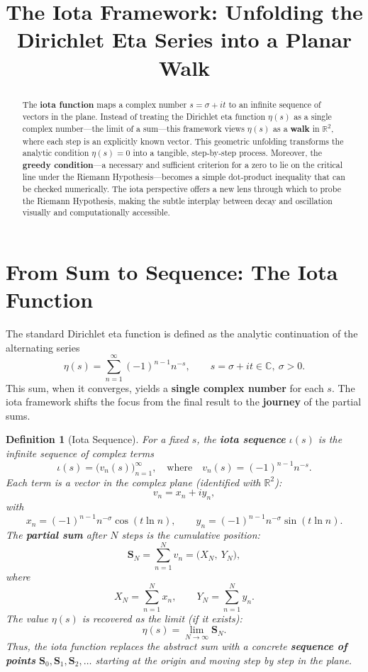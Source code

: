 \documentclass[12pt,a4paper]{article}
\title{The Iota Framework: Unfolding the Dirichlet Eta Series into a Planar Walk}
\author{}
\date{}
\newtheorem{definition}{Definition}[section]
\begin{document}
\maketitle

\begin{abstract}
The \textbf{iota function} maps a complex number \( s = \sigma + it \) to an infinite sequence of vectors in the plane. Instead of treating the Dirichlet eta function \(\eta(s)\) as a single complex number---the limit of a sum---this framework views \(\eta(s)\) as a \textbf{walk} in \(\mathbb{R}^2\), where each step is an explicitly known vector. This geometric unfolding transforms the analytic condition \(\eta(s) = 0\) into a tangible, step‑by‑step process. Moreover, the \textbf{greedy condition}---a necessary and sufficient criterion for a zero to lie on the critical line under the Riemann Hypothesis---becomes a simple dot‑product inequality that can be checked numerically. The iota perspective offers a new lens through which to probe the Riemann Hypothesis, making the subtle interplay between decay and oscillation visually and computationally accessible.
\end{abstract}

\section{From Sum to Sequence: The Iota Function}

The standard Dirichlet eta function is defined as the analytic continuation of the alternating series
\[
\eta(s) = \sum_{n=1}^{\infty} (-1)^{n-1} n^{-s},\qquad s = \sigma + it \in \mathbb{C},\ \sigma > 0.
\]
This sum, when it converges, yields a \textbf{single complex number} for each \( s \). The iota framework shifts the focus from the final result to the \textbf{journey} of the partial sums.

\begin{definition}[Iota Sequence]
For a fixed \( s \), the \textbf{iota sequence} \(\iota(s)\) is the infinite sequence of complex terms
\[
\iota(s) = \bigl( v_n(s) \bigr)_{n=1}^{\infty},\quad\text{where}\quad v_n(s) = (-1)^{n-1} n^{-s}.
\]
Each term is a vector in the complex plane (identified with \(\mathbb{R}^2\)):
\[
v_n = x_n + i y_n,
\]
with
\[
x_n = (-1)^{n-1} n^{-\sigma} \cos(t\ln n),\qquad
y_n = (-1)^{n-1} n^{-\sigma} \sin(t\ln n).
\]
The \textbf{partial sum} after \( N \) steps is the cumulative position:
\[
\mathbf{S}_N = \sum_{n=1}^{N} v_n = \bigl( X_N,\ Y_N \bigr),
\]
where
\[
X_N = \sum_{n=1}^{N} x_n,\qquad Y_N = \sum_{n=1}^{N} y_n.
\]
The value \(\eta(s)\) is recovered as the limit (if it exists):
\[
\eta(s) = \lim_{N\to\infty} \mathbf{S}_N.
\]
Thus, the iota function replaces the abstract sum with a concrete \textbf{sequence of points} \(\mathbf{S}_0, \mathbf{S}_1, \mathbf{S}_2, \dots\) starting at the origin and moving step by step in the plane.
\end{definition}
\end{document}
